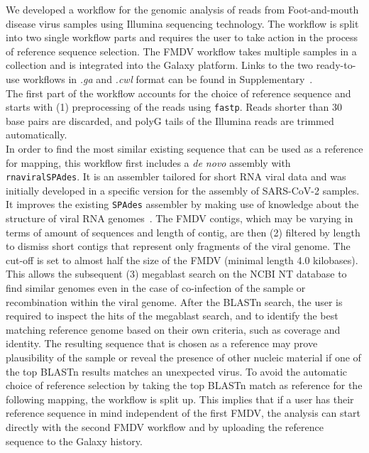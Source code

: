 We developed a workflow for the genomic analysis of reads from Foot-and-mouth disease virus samples using Illumina sequencing technology. The workflow is split into two single workflow parts and requires the user to take action in the process of reference sequence selection. The \ac{FMDV} workflow takes multiple samples in a collection and is integrated into the Galaxy platform. Links to the two ready-to-use workflows in \textit{.ga} and \textit{.cwl} format can be found in Supplementary~. \\
The first part of the workflow accounts for the choice of reference sequence and starts with (1) preprocessing of the reads using \texttt{fastp}. Reads shorter than 30 base pairs are discarded, and polyG tails of the Illumina reads are trimmed automatically. \\
In order to find the most similar existing sequence that can be used as a reference for mapping, this workflow first includes a \textit{de novo} assembly with \texttt{rnaviralSPAdes}. It is an assembler tailored for short \ac{RNA} viral data and was initially developed in a specific version for the assembly of \ac{SARS-CoV-2} samples. It improves the existing \texttt{SPAdes} assembler by making use of knowledge about the structure of viral \ac{RNA} genomes~\cite{meleshko2022coronaspades}. The \ac{FMDV} contigs, which may be varying in terms of amount of sequences and length of contig, are then (2) filtered by length to dismiss short contigs that represent only fragments of the viral genome. The cut-off is set to almost half the size of the \ac{FMDV} (minimal length 4.0 kilobases). This allows the subsequent (3) megablast search on the \ac{NCBI} NT database to find similar genomes even in the case of co-infection of the sample or recombination within the viral genome. After the \ac{BLAST}n search, the user is required to inspect the hits of the megablast search, and to identify the best matching reference genome based on their own criteria, such as coverage and identity. The resulting sequence that is chosen as a reference may prove plausibility of the sample or reveal the presence of other nucleic material if one of the top \ac{BLAST}n results matches an unexpected virus. To avoid the automatic choice of reference selection by taking the top \ac{BLAST}n match as reference for the following mapping, the workflow is split up. This implies that if a user has their reference sequence in mind independent of the first \ac{FMDV}, the analysis can start directly with the second \ac{FMDV} workflow and by uploading the reference sequence to the Galaxy history.


